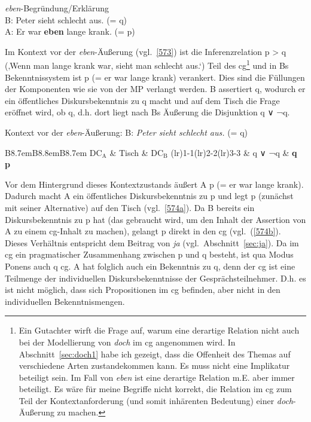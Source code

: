 \begin{exe}
	\ex\label{572} \textit{eben}-Begründung/Erklärung\\
	B: Peter sieht schlecht aus. (= q)\\
	A: Er war \textbf{eben} lange krank. (= p)	
\end{exe}
Im Kontext vor der \textit{eben}-Äußerung (vgl.\ \ref{573}) ist die Inferenzrelation p > q (‚Wenn man lange krank war, sieht man schlecht aus.‘) Teil des cg\footnote{Ein Gutachter wirft die Frage auf, warum eine derartige Relation nicht auch bei der Modellierung von \textit{doch} im cg angenommen wird. In Abschnitt~\ref{sec:doch1} habe ich gezeigt, dass die Offenheit des Themas auf verschiedene Arten zustandekommen kann. Es muss nicht eine Implikatur beteiligt sein. Im Fall von \textit{eben} ist eine derartige Relation m.E. aber immer beteiligt. Es wäre für meine Begriffe nicht korrekt, die Relation im cg zum Teil der Kontextanforderung (und somit inhärenten Bedeutung) einer \textit{doch}-Äußerung zu machen.} und in Bs Bekenntnissystem ist p (= er war lange krank) verankert. Dies sind die Füllungen der Komponenten wie sie von der MP verlangt werden. B assertiert q, wodurch er ein öffentliches Diskursbekenntnis zu q macht und auf dem Tisch die Frage eröffnet wird, ob q, d.h. dort liegt nach Bs Äußerung die Disjunktion q ∨ ¬q. 


\begin{exe}
	\ex\label{573} Kontext vor der \textit{eben}-Äußerung: B: \textit{Peter sieht schlecht aus.} (= q)\\
 		\begin{tabular}[t]{B{8.7em}B{8.8em}B{8.7em}}
\lsptoprule 	
   		$\textrm{DC}_{\textrm{A}}$ & {Tisch} & {$\textrm{DC}_{\textrm{B}}$} \tabularnewline\cmidrule(lr){1-1}\cmidrule(lr){2-2}\cmidrule(lr){3-3}
   		{} & q ∨ ¬q & \textbf{q}\\\textbf{p} \tabularnewline\midrule      
   		 \tabularnewline   
  		 \lspbottomrule
\end{tabular}
\end{exe}
Vor dem Hintergrund dieses Kontextzustands äußert A p (= er war lange krank). Dadurch macht A ein öffentliches Diskursbekenntnis zu p und legt p (zunächst mit seiner Alternative) auf den Tisch (vgl.\ \ref{574a}). Da B bereits ein Diskursbekenntnis zu p hat (das gebraucht wird, um den Inhalt der Assertion von A zu einem cg-Inhalt zu machen), gelangt p direkt in den cg (vgl.\ (\ref{574b}). Dieses Verhältnis entspricht dem Beitrag von \textit{ja} (vgl.\ Abschnitt~\ref{sec:ja}). Da im cg ein pragmatischer Zusammenhang zwischen p und q besteht, ist qua Modus Ponens  auch q cg. A hat folglich auch ein Bekenntnis zu q, denn der cg ist eine Teilmenge der individuellen Diskursbekenntnisse der Gesprächsteilnehmer. D.h. es ist nicht möglich, dass sich Propositionen im cg befinden, aber nicht in den individuellen Bekenntnismengen.\largerpage

